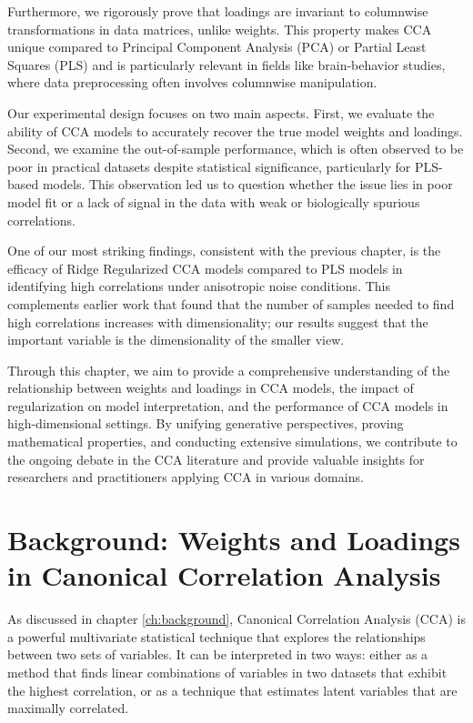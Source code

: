 Furthermore, we rigorously prove that loadings are invariant to columnwise transformations in data matrices, unlike weights. This property makes CCA unique compared to Principal Component Analysis (PCA) or Partial Least Squares (PLS) and is particularly relevant in fields like brain-behavior studies, where data preprocessing often involves columnwise manipulation.

Our experimental design focuses on two main aspects. First, we evaluate the ability of CCA models to accurately recover the true model weights and loadings. Second, we examine the out-of-sample performance, which is often observed to be poor in practical datasets despite statistical significance, particularly for PLS-based models. This observation led us to question whether the issue lies in poor model fit or a lack of signal in the data with weak or biologically spurious correlations.

One of our most striking findings, consistent with the previous chapter, is the efficacy of Ridge Regularized CCA models compared to PLS models in identifying high correlations under anisotropic noise conditions. This complements earlier work \citep{helmer2020stability} that found that the number of samples needed to find high correlations increases with dimensionality; our results suggest that the important variable is the dimensionality of the smaller view.

Through this chapter, we aim to provide a comprehensive understanding of the relationship between weights and loadings in CCA models, the impact of regularization on model interpretation, and the performance of CCA models in high-dimensional settings. By unifying generative perspectives, proving mathematical properties, and conducting extensive simulations, we contribute to the ongoing debate in the CCA literature and provide valuable insights for researchers and practitioners applying CCA in various domains.

\section{Background: Weights and Loadings in Canonical Correlation Analysis}

As discussed in chapter \ref{ch:background}, Canonical Correlation Analysis (CCA) is a powerful multivariate statistical technique that explores the relationships between two sets of variables. It can be interpreted in two ways: either as a method that finds linear combinations of variables in two datasets that exhibit the highest correlation, or as a technique that estimates latent variables that are maximally correlated.

